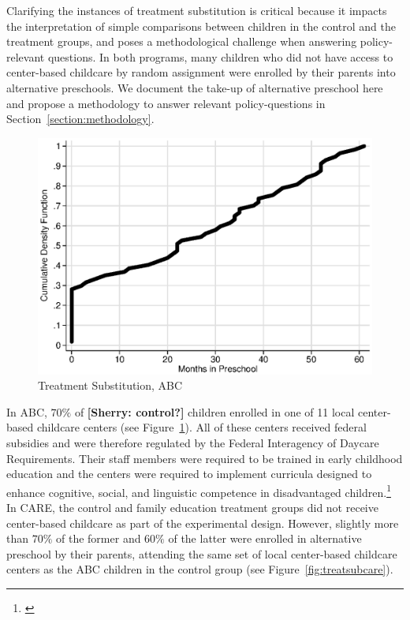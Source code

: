 \noindent Clarifying the instances of treatment substitution is critical because it impacts the interpretation of simple comparisons between children in the control and the treatment groups, and poses a methodological challenge when answering policy-relevant questions.
In both programs, many children who did not have access to center-based childcare by random assignment were enrolled by their parents into alternative preschools. We document the take-up of alternative preschool here and propose a methodology to answer relevant policy-questions in Section~\ref{section:methodology}.\\

\begin{figure}[H]
		\caption{Treatment Substitution, ABC} \label{fig:treatsubabc}
		\includegraphics[width=.9\columnwidth]{output/abc_controlcontamination_months.eps}
\end{figure}

\noindent In ABC, $70\%$ of \textbf{[Sherry: control?]} children enrolled in one of 11 local center-based childcare centers (see Figure~\ref{fig:treatsubabc}). All of these centers received federal subsidies and were therefore regulated by the Federal Interagency of Daycare Requirements. Their staff members were required to be trained in early childhood education and the centers were required to implement curricula designed to enhance cognitive, social, and linguistic competence in disadvantaged children.\footnote{\citet{Burchinal_etal_1989_CD_Daycare-Pre-K-Dev}} In CARE, the control and family education treatment groups did not receive center-based childcare as part of the experimental design. However, slightly more than $70\%$ of the  former and $60\%$ of the latter were enrolled in alternative preschool by their parents, attending the same set of local center-based childcare centers as the ABC children in the control group (see Figure~\ref{fig:treatsubcare}).\\

